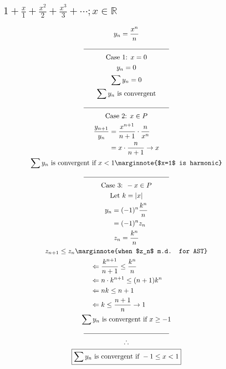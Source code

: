 \documentclass[letterpaper]{article}
\DeclarePairedDelimiter{\abs}{\lvert}{\rvert}
\begin{document}
\subsection{$1+\frac{x}{1}+\frac{x^2}{2}+\frac{x^3}{3}+\dotsb;x\in\mathbb{R}$}
\begin{gather*}
y_n=\frac{x^n}{n} \\
\line(1, 0){125} \\
\text{Case 1: } x=0 \\
y_n=0 \\
\sum y_n=0 \\
\sum y_n \text{ is convergent} \\
\line(1, 0){125} \\
\text{Case 2: } x\in P \\
\begin{aligned}
\frac{y_{n+1}}{y_n}&=\frac{x^{n+1}}{n+1}\cdot\frac{n}{x^n} \\
&=x\cdot\frac{n}{n+1}\rightarrow x
\end{aligned} \\
\sum y_n \text{ is convergent if } x<1 \marginnote{$x=1$ is harmonic} \\
\line(1, 0){125} \\
\text{Case 3: } -x\in P \\
\text{Let }k=\abs{x} \\
\begin{aligned}
y_n&=(-1)^n\frac{k^n}{n} \\
&=(-1)^nz_n
\end{aligned} \\
z_n=\frac{k^n}{n} \\
z_{n+1}\leq z_n \marginnote{when $z_n$ m.d. for AST} \\
\begin{aligned}
&\Leftarrow\frac{k^{n+1}}{n+1}\leq\frac{k^n}{n} \\
&\Leftarrow n\cdot k^{n+1}\leq(n+1)k^n \\
&\Leftarrow nk\leq n+1 \\
&\Leftarrow k\leq \frac{n+1}{n}\rightarrow1
\end{aligned} \\
\sum y_n \text{ is convergent if } x\geq-1 \\
\line(1, 0){125} \\
\therefore \\
\boxed{\sum y_n \text{ is convergent if } -1\leq x<1}
\end{gather*}

\section{}
\end{document}
